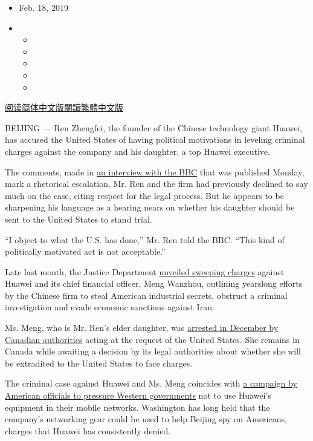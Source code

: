 \begin{itemize}
\item
  Feb. 18, 2019
\item
  \begin{itemize}
  \item
  \item
  \item
  \item
  \item
  \end{itemize}
\end{itemize}

\href{https://cn.nytimes.com/technology/20190219/huawei-ren-zhengfei-bbc/}{阅读简体中文版}\href{https://cn.nytimes.com/technology/20190219/huawei-ren-zhengfei-bbc/zh-hant/}{閱讀繁體中文版}

BEIJING --- Ren Zhengfei, the founder of the Chinese technology giant
Huawei, has accused the United States of having political motivations in
leveling criminal charges against the company and his daughter, a top
Huawei executive.

The comments, made in
\href{https://www.bbc.com/news/business-47274679}{an interview with the
BBC} that was published Monday, mark a rhetorical escalation. Mr. Ren
and the firm had previously declined to say much on the case, citing
respect for the legal process. But he appears to be sharpening his
language as a hearing nears on whether his daughter should be sent to
the United States to stand trial.

``I object to what the U.S. has done,'' Mr. Ren told the BBC. ``This
kind of politically motivated act is not acceptable.''

Late last month, the Justice Department
\href{https://www.nytimes.com/2019/01/28/us/politics/meng-wanzhou-huawei-iran.html}{unveiled
sweeping charges} against Huawei and its chief financial officer, Meng
Wanzhou, outlining yearslong efforts by the Chinese firm to steal
American industrial secrets, obstruct a criminal investigation and evade
economic sanctions against Iran.

Ms. Meng, who is Mr. Ren's elder daughter, was
\href{https://www.nytimes.com/2018/12/05/business/huawei-cfo-arrest-canada-extradition.html}{arrested
in December by Canadian authorities} acting at the request of the United
States. She remains in Canada while awaiting a decision by its legal
authorities about whether she will be extradited to the United States to
face charges.

The criminal case against Huawei and Ms. Meng coincides with
\href{https://www.nytimes.com/2019/01/26/us/politics/huawei-china-us-5g-technology.html}{a
campaign by American officials to pressure Western governments} not to
use Huawei's equipment in their mobile networks. Washington has long
held that the company's networking gear could be used to help Beijing
spy on Americans, charges that Huawei has consistently denied.

